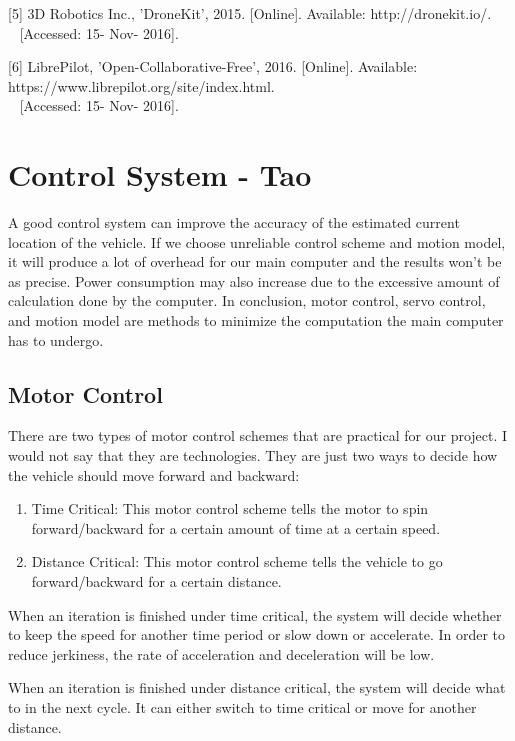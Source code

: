 \documentclass[compsoc,draftclsnofoot,onecolumn,10pt]{IEEEtran}
\begin{document}
[5] 3D Robotics Inc., 'DroneKit', 2015. [Online]. Available: http://dronekit.io/.\\~
[Accessed: 15- Nov- 2016].\par

[6] LibrePilot, 'Open-Collaborative-Free', 2016. [Online]. Available: https://www.librepilot.org/site/index.html.\\~
[Accessed: 15- Nov- 2016].\par


\newpage

\section{Control System - Tao}
A good control system can improve the accuracy of the estimated current location 
of the vehicle. If we choose unreliable control scheme and motion model, it will 
produce a lot of overhead for our main computer and the results won't be as precise. 
Power consumption may also increase due to the excessive amount of calculation done 
by the computer. In conclusion, motor control, servo control, and motion model are 
methods to minimize the computation the main computer has to undergo.

\subsection{Motor Control}
There are two types of motor control schemes that are practical for our project. 
I would not say that they are technologies. They are just two ways to decide 
how the vehicle should move forward and backward:
\begin{enumerate}
\item Time Critical: This motor control scheme tells the motor to spin 
forward/backward for a certain amount of time at a certain speed.
\item Distance Critical: This motor control scheme tells the vehicle to go 
forward/backward for a certain distance.
\end{enumerate}
When an iteration is finished under time critical, the system will decide whether 
to keep the speed for another time period or slow down or accelerate. In order 
to reduce jerkiness, the rate of acceleration and deceleration will be low.\par

When an iteration is finished under distance critical, the system will decide what 
to in the next cycle. It can either switch to time critical or move for another 
distance.\par
\end{document}
